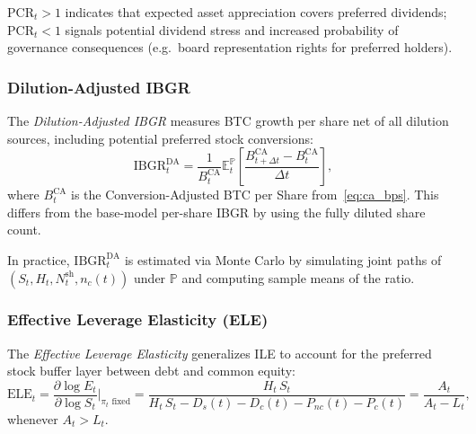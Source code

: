 \noindent $\mathrm{PCR}_t > 1$ indicates that expected asset appreciation
covers preferred dividends; $\mathrm{PCR}_t < 1$ signals potential
dividend stress and increased probability of governance consequences
(e.g.\ board representation rights for preferred holders).

\subsubsection{Dilution-Adjusted IBGR}

\begin{definition}\label{def:da_ibgr}
The \emph{Dilution-Adjusted IBGR} measures BTC growth per share net of
all dilution sources, including potential preferred stock conversions:
\begin{equation}\label{eq:da_ibgr}
  \mathrm{IBGR}_t^{\mathrm{DA}}
  = \frac{1}{B_t^{\mathrm{CA}}}
    \mathbb{E}_t^{\mathbb{P}}\!\left[
      \frac{B_{t+\Delta t}^{\mathrm{CA}} - B_t^{\mathrm{CA}}}{\Delta t}
    \right],
\end{equation}
where $B_t^{\mathrm{CA}}$ is the Conversion-Adjusted BTC per Share
from~\eqref{eq:ca_bps}.  This differs from the base-model per-share IBGR
by using the fully diluted share count.
\end{definition}

\noindent In practice, $\mathrm{IBGR}_t^{\mathrm{DA}}$ is estimated via
Monte Carlo by simulating joint paths of $(S_t, H_t, N_t^{\mathrm{sh}},
n_c(t))$ under $\mathbb{P}$ and computing sample means of the ratio.

\subsubsection{Effective Leverage Elasticity (ELE)}

\begin{definition}[ELE]\label{def:ele}
The \emph{Effective Leverage Elasticity} generalizes ILE to account for
the preferred stock buffer layer between debt and common equity:
\begin{equation}\label{eq:ele}
  \mathrm{ELE}_t
  = \frac{\partial \log E_t}{\partial \log S_t}\bigg|_{\pi_t\text{ fixed}}
  = \frac{H_t\, S_t}
         {H_t\, S_t - D_s(t) - D_c(t) - P_{nc}(t) - P_c(t)}
  = \frac{A_t}{A_t - L_t},
\end{equation}
whenever $A_t > L_t$.
\end{definition}

